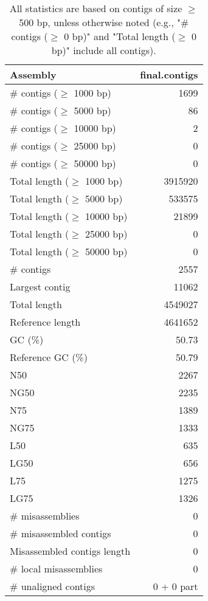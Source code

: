 \documentclass[12pt,a4paper]{article}
\begin{document}
\begin{table}[ht]
\begin{center}
\caption{All statistics are based on contigs of size $\geq$ 500 bp, unless otherwise noted (e.g., "\# contigs ($\geq$ 0 bp)" and "Total length ($\geq$ 0 bp)" include all contigs).}
\begin{tabular}{|l*{1}{|r}|}
\hline
Assembly & final.contigs \\ \hline
\# contigs ($\geq$ 1000 bp) & 1699 \\ \hline
\# contigs ($\geq$ 5000 bp) & 86 \\ \hline
\# contigs ($\geq$ 10000 bp) & 2 \\ \hline
\# contigs ($\geq$ 25000 bp) & 0 \\ \hline
\# contigs ($\geq$ 50000 bp) & 0 \\ \hline
Total length ($\geq$ 1000 bp) & 3915920 \\ \hline
Total length ($\geq$ 5000 bp) & 533575 \\ \hline
Total length ($\geq$ 10000 bp) & 21899 \\ \hline
Total length ($\geq$ 25000 bp) & 0 \\ \hline
Total length ($\geq$ 50000 bp) & 0 \\ \hline
\# contigs & 2557 \\ \hline
Largest contig & 11062 \\ \hline
Total length & 4549027 \\ \hline
Reference length & 4641652 \\ \hline
GC (\%) & 50.73 \\ \hline
Reference GC (\%) & 50.79 \\ \hline
N50 & 2267 \\ \hline
NG50 & 2235 \\ \hline
N75 & 1389 \\ \hline
NG75 & 1333 \\ \hline
L50 & 635 \\ \hline
LG50 & 656 \\ \hline
L75 & 1275 \\ \hline
LG75 & 1326 \\ \hline
\# misassemblies & 0 \\ \hline
\# misassembled contigs & 0 \\ \hline
Misassembled contigs length & 0 \\ \hline
\# local misassemblies & 0 \\ \hline
\# unaligned contigs & 0 + 0 part \\ \hline

\end{tabular}
\end{center}
\end{table}
\end{document}
